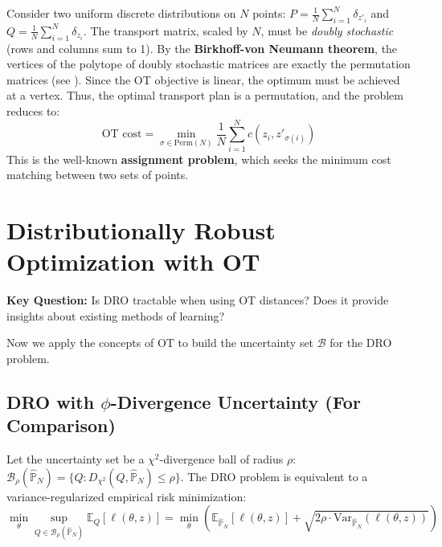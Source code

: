 \documentclass[12pt]{report}
\begin{document}
Consider two uniform discrete distributions on $N$ points: $P = \frac{1}{N} \sum_{i=1}^N \delta_{z'_i}$ and $Q = \frac{1}{N} \sum_{i=1}^N \delta_{z_i}$. The transport matrix, scaled by $N$, must be \textit{doubly stochastic} (rows and columns sum to 1). By the \textbf{Birkhoff-von Neumann theorem}, the vertices of the polytope of doubly stochastic matrices are exactly the permutation matrices (see \cite{villani2009optimal}). Since the OT objective is linear, the optimum must be achieved at a vertex. Thus, the optimal transport plan is a permutation, and the problem reduces to:
\[
\text{OT cost} = \min_{\sigma \in \text{Perm}(N)} \frac{1}{N} \sum_{i=1}^N c(z_i, z'_{\sigma(i)})
\]
This is the well-known \textbf{assignment problem}, which seeks the minimum cost matching between two sets of points.

\section{Distributionally Robust Optimization with OT}
\noindent\textbf{Key Question:} Is DRO tractable when using OT distances? Does it provide insights about existing methods of learning?

Now we apply the concepts of OT to build the uncertainty set $\mathcal{B}$ for the DRO problem.

\subsection{DRO with $\phi$-Divergence Uncertainty (For Comparison)}

\begin{theorem}

Let the uncertainty set be a $\chi^2$-divergence ball of radius $\rho$: $\mathcal{B}_\rho(\hat{\mathbb{P}}_N) = \{ Q : D_{\chi^2}(Q, \hat{\mathbb{P}}_N) \le \rho \}$. The DRO problem is equivalent to a variance-regularized empirical risk minimization:
\[
\min_\theta \sup_{Q \in \mathcal{B}_\rho(\hat{\mathbb{P}}_N)} \mathbb{E}_Q[\ell(\theta, z)] = \min_\theta \left( \mathbb{E}_{\hat{\mathbb{P}}_N}[\ell(\theta, z)] + \sqrt{2\rho \cdot \text{Var}_{\hat{\mathbb{P}}_N}(\ell(\theta, z))} \right)
\]
\end{theorem}
\end{document}
